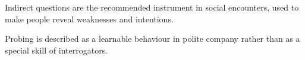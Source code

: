 

\begin{distilled}
  \item Indirect questions are the recommended instrument in social encounters, used to make people reveal weaknesses and intentions.
  \item Probing is described as a learnable behaviour in polite company rather than as a special skill of interrogators.
\end{distilled}
